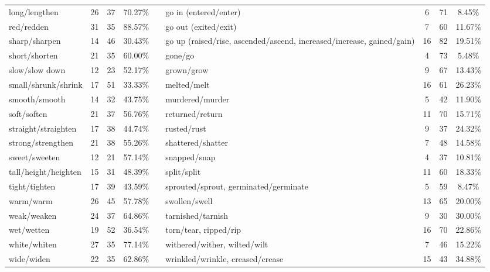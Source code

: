 \begin{tabular}{p{3cm}ccccp{3cm}ccc}
long/lengthen & 26 & 37 & 70.27\% & & go in (entered/enter) & 6 & 71 & 8.45\% \\
red/redden & 31 & 35 & 88.57\% & & go out (exited/exit) & 7 & 60 & 11.67\% \\
sharp/sharpen & 14 & 46 & 30.43\% & & go up (raised/rise, ascended/ascend, increased/increase, gained/gain) & 16 & 82 & 19.51\% \\
short/shorten & 21 & 35 & 60.00\% & & gone/go & 4 & 73 & 5.48\% \\
slow/slow down & 12 & 23 & 52.17\% & & grown/grow & 9 & 67 & 13.43\% \\
small/shrunk/shrink & 17 & 51 & 33.33\% & & melted/melt & 16 & 61 & 26.23\% \\
smooth/smooth & 14 & 32 & 43.75\% & & murdered/murder & 5 & 42 & 11.90\% \\
soft/soften & 21 & 37 & 56.76\% & & returned/return & 11 & 70 & 15.71\% \\
straight/straighten & 17 & 38 & 44.74\% & & rusted/rust & 9 & 37 & 24.32\% \\
strong/strengthen & 21 & 38 & 55.26\% & & shattered/shatter & 7 & 48 & 14.58\% \\
sweet/sweeten & 12 & 21 & 57.14\% & & snapped/snap & 4 & 37 & 10.81\% \\
tall/height/heighten & 15 & 31 & 48.39\% & & split/split & 11 & 60 & 18.33\% \\
tight/tighten & 17 & 39 & 43.59\% & & sprouted/sprout, germinated/germinate & 5 & 59 & 8.47\% \\
warm/warm & 26 & 45 & 57.78\% & & swollen/swell & 13 & 65 & 20.00\% \\
weak/weaken & 24 & 37 & 64.86\% & & tarnished/tarnish & 9 & 30 & 30.00\% \\
wet/wetten & 19 & 52 & 36.54\% & & torn/tear, ripped/rip & 16 & 70 & 22.86\% \\
white/whiten & 27 & 35 & 77.14\% & & withered/wither, wilted/wilt & 7 & 46 & 15.22\% \\
wide/widen & 22 & 35 & 62.86\% & & wrinkled/wrinkle, creased/crease & 15 & 43 & 34.88\%
\end{tabular}